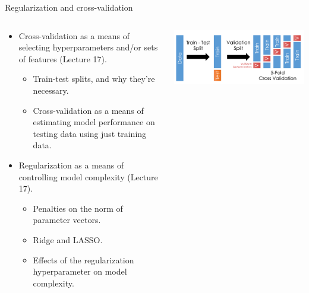 \documentclass[aspectratio=169]{../latex_main/tntbeamer}  %
\begin{document}
	\begin{frame}{Regularization and cross-validation}
	          \begin{columns}
	            \begin{column}{.6\textwidth}
	            \begin{itemize}
	                \item Cross-validation as a means of selecting hyperparameters and/or sets of features (Lecture 17).
	                \begin{itemize}
	                    \item Train-test splits, and why they’re necessary.
	                    \item Cross-validation as a means of estimating model performance on testing data using just training data. 
	                \end{itemize}
	                \item Regularization as a means of controlling model complexity (Lecture 17).
	                \begin{itemize}
	                    \item Penalties on the norm of parameter vectors.
	                    \item Ridge and LASSO.
	                    \item Effects of the regularization hyperparameter on model complexity.
	                \end{itemize}
	            \end{itemize}
	            \end{column}
	            
	            
	            \begin{column}{.4\textwidth}
	                        \vspace{1.5cm}
	                      \begin{center}
	                          \includegraphics[scale=.55]{Bild9}
	                      \end{center} 
	            \end{column}
	       \end{columns}
	\end{frame}
	
\end{document}
